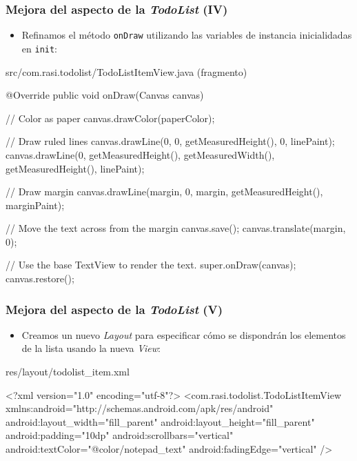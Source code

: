 \documentclass[hyperref={pdfpagelabels=true},ucs]{beamer}
\begin{document}
\begin{frame}[fragile]
\frametitle{Mejora del aspecto de la \emph{TodoList} (IV)}

\begin{itemize}
\item Refinamos el método \verb|onDraw| utilizando las variables de
  instancia inicialidadas en \verb|init|:
\end{itemize}

\begin{tiny}
\begin{block}{src/com.rasi.todolist/TodoListItemView.java (fragmento)}
\begin{java}
  @Override
  public void onDraw(Canvas canvas) {
    // Color as paper
    canvas.drawColor(paperColor);

    // Draw ruled lines
    canvas.drawLine(0, 0, getMeasuredHeight(), 0, linePaint);
    canvas.drawLine(0, getMeasuredHeight(),
    getMeasuredWidth(), getMeasuredHeight(),
    linePaint);

    // Draw margin
    canvas.drawLine(margin, 0, margin, getMeasuredHeight(), marginPaint);

    // Move the text across from the margin
    canvas.save();
    canvas.translate(margin, 0);
  
    // Use the base TextView to render the text.
    super.onDraw(canvas);
    canvas.restore();
  }
\end{java}
\end{block}
\end{tiny}

\end{frame}



\begin{frame}[fragile]
\frametitle{Mejora del aspecto de la \emph{TodoList} (V)}

\begin{itemize}
\item Creamos un nuevo \emph{Layout} para especificar cómo se
  dispondrán los elementos de la lista usando la nueva \emph{View}:
\end{itemize}

\begin{tiny}
\begin{block}{res/layout/todolist\_item.xml}
\begin{xml}
<?xml version="1.0" encoding="utf-8"?>
<com.rasi.todolist.TodoListItemView
   xmlns:android="http://schemas.android.com/apk/res/android"
   android:layout_width="fill_parent"
   android:layout_height="fill_parent"
   android:padding="10dp"
   android:scrollbars="vertical"
   android:textColor="@color/notepad_text"
   android:fadingEdge="vertical"
/>
\end{xml}
\end{block}
\end{tiny}

\end{frame}
\end{document}
